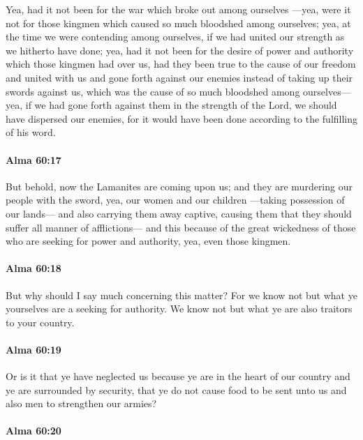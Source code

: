 			Yea, had it not been for the war which broke out among ourselves
			---yea, were it not for those kingmen
			which caused so much bloodshed among ourselves;
			yea, at the time we were contending among ourselves,
			if we had united our strength as we hitherto have done;
			yea, had it not been for the desire of power and authority
			which those kingmen had over us,
			had they been true to the cause of our freedom
			and united with us and gone forth against our enemies
			instead of taking up their swords against us,
			which was the cause of so much bloodshed among ourselves---
			yea, if we had gone forth against them in the strength of the Lord,
			we should have dispersed our enemies,
			for it would have been done according to the fulfilling of his word.

		\paragraph{Alma 60:17} %
			\label{ALMA-60-17}

			But behold, now the Lamanites are coming upon us;
			and they are murdering our people with the sword,
			yea, our women and our children
			---taking possession of our lands---
			and also carrying them away captive,
			causing them that they should suffer all manner of afflictions---
			and this because of the great wickedness of those
			who are seeking for power and authority,
			yea, even those kingmen.

		\paragraph{Alma 60:18} %
			\label{ALMA-60-18}

			But why should I say much concerning this matter?
			For we know not but what ye yourselves are a seeking for authority.
			We know not but what ye are also traitors to your country.

		\paragraph{Alma 60:19} %
			\label{ALMA-60-19}

			Or is it that ye have neglected us
			because ye are in the heart of our country
			and ye are surrounded by security,
			that ye do not cause food to be sent unto us
			and also men to strengthen our armies?

		\paragraph{Alma 60:20} %
			\label{ALMA-60-20}

